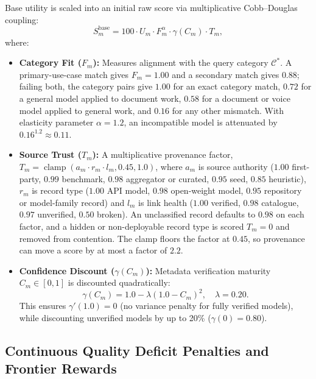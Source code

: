\documentclass[pdflatex,sn-mathphys-num]{sn-jnl}
\theoremstyle{thmstyleone}
\theoremstyle{thmstylethree}
\begin{document}
Base utility is scaled into an initial raw score via multiplicative Cobb--Douglas coupling:
\begin{equation}\label{eq:base_score}
S_m^{\text{base}} = 100 \cdot U_m \cdot F_m^\alpha \cdot \gamma(C_m) \cdot T_m,
\end{equation}
where:
\begin{itemize}
  \item \textbf{Category Fit ($F_m$):} Measures alignment with the query category $\mathcal{C}^*$. A primary-use-case match gives $F_m = 1.00$ and a secondary match gives $0.88$; failing both, the category pairs give $1.00$ for an exact category match, $0.72$ for a general model applied to document work, $0.58$ for a document or voice model applied to general work, and $0.16$ for any other mismatch. With elasticity parameter $\alpha = 1.2$, an incompatible model is attenuated by $0.16^{1.2} \approx 0.11$.
  \item \textbf{Source Trust ($T_m$):} A multiplicative provenance factor, $T_m = \operatorname{clamp}(a_m \cdot r_m \cdot l_m, 0.45, 1.0)$, where $a_m$ is source authority ($1.00$ first-party, $0.99$ benchmark, $0.98$ aggregator or curated, $0.95$ seed, $0.85$ heuristic), $r_m$ is record type ($1.00$ API model, $0.98$ open-weight model, $0.95$ repository or model-family record) and $l_m$ is link health ($1.00$ verified, $0.98$ catalogue, $0.97$ unverified, $0.50$ broken). An unclassified record defaults to $0.98$ on each factor, and a hidden or non-deployable record type is scored $T_m = 0$ and removed from contention. The clamp floors the factor at $0.45$, so provenance can move a score by at most a factor of $2.2$.
  \item \textbf{Confidence Discount ($\gamma(C_m)$):} Metadata verification maturity $C_m \in [0, 1]$ is discounted quadratically:
  \begin{equation}\label{eq:confidence}
  \gamma(C_m) = 1.0 - \lambda (1.0 - C_m)^2, \quad \lambda = 0.20.
  \end{equation}
  This ensures $\gamma'(1.0) = 0$ (no variance penalty for fully verified models), while discounting unverified models by up to 20\% ($\gamma(0) = 0.80$).
\end{itemize}

\subsection{Continuous Quality Deficit Penalties and Frontier Rewards}\label{subsec:deficits}
\end{document}
